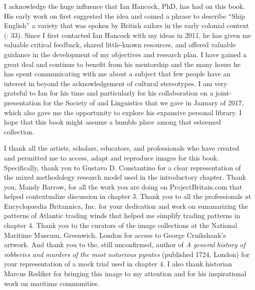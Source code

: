 I acknowledge the huge influence that {Ian Hancock}, PhD, has had on this book. His early work on  first suggested the idea and coined a phrase to describe “Ship English” a variety that was spoken by British sailors in the early colonial context (\citealt{Hancock1976}: 33). Since I first contacted Ian Hancock with my ideas in 2011, he has given me valuable critical feedback, shared little-known resources, and offered valuable guidance in the development of my objectives and research plan. I have gained a great deal and continue to benefit from his mentorship and the many hours he has spent communicating with me about a subject that few people have an interest in beyond the acknowledgement of cultural stereotypes. I am very grateful to Ian for his time and particularly for his collaboration on a joint-presentation for the Society of  and  Linguistics that we gave in January of 2017, which also gave me the opportunity to explore his expansive personal library. I hope that this book might assume a humble place among that esteemed collection. 

I thank all the artists, scholars, educators, and professionals who have created and permitted me to access, adapt and reproduce images for this book. Specifically, thank you to Gustavo D. Constantino for a clear representation of the mixed methodology research model used in the introductory chapter. Thank you, Mandy Barrow, for all the work you are doing on ProjectBritain.com that helped contextualize discussion in chapter 3. Thank you to all the professionals at Encyclopaedia Britannica, Inc. for your dedication and work on summarizing the patterns of Atlantic trading winds that helped me simplify trading patterns in chapter 4. Thank you to the curators of the image collections at the National Maritime Museum, Greenwich, London for access to George Cruikshank’s artwork. And thank you to the, still unconfirmed, author of \textit{A} \textit{general} \textit{history} \textit{of} \textit{robberies} \textit{and} \textit{murders} \textit{of} \textit{the} \textit{most} \textit{notorious} \textit{pyrates} (published 1724, London) for your representation of a mock trial used in chapter 4. I also thank historian {Marcus Rediker} for bringing this image to my attention and for his inspirational work on maritime communities. 

